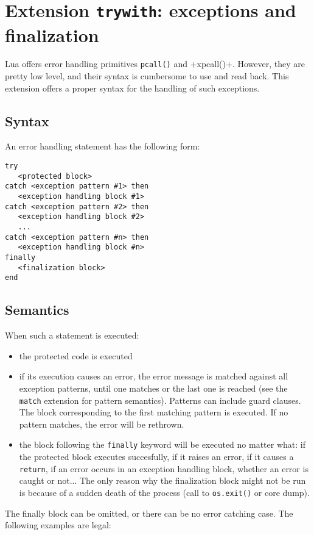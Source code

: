 \section{Extension {\tt trywith}: exceptions and finalization}
Lua offers error handling primitives \verb+pcall()+ and
\veb+xpcall()+. However, they are pretty low level, and their syntax
is cumbersome to use and read back. This extension offers a proper
syntax for the handling of such exceptions.

\subsection{Syntax}
An error handling statement has the following form:

\begin{verbatim}
try
   <protected block>
catch <exception pattern #1> then
   <exception handling block #1>
catch <exception pattern #2> then
   <exception handling block #2>
   ...
catch <exception pattern #n> then
   <exception handling block #n>
finally
   <finalization block>
end
\end{verbatim}

\subsection{Semantics}
When such a statement is executed:
\begin{itemize}
\item the protected code is executed
\item if its execution causes an error, the error message is matched
  against all exception patterns, until one matches or the last one is
  reached (see the \verb+match+ extension for pattern
  semantics). Patterns can include guard clauses. The block
  corresponding to the first matching pattern is executed. If no
  pattern matches, the error will be rethrown.
\item the block following the \verb+finally+ keyword will be executed
  no matter what: if the protected block executes succesfully, if it
  raises an error, if it causes a \verb+return+, if an error occurs in
  an exception handling block, whether an error is caught or
  not... The only reason why the finalization block might not be run
  is because of a sudden death of the process (call to {\tt os.exit()}
  or core dump).
\end{itemize}

The finally block can be omitted, or there can be no error catching
case. The following examples are legal:

